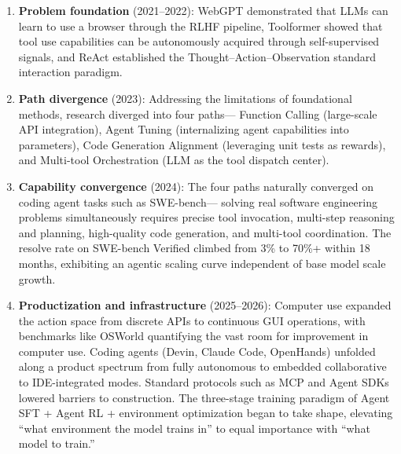 \begin{enumerate}[leftmargin=2em]
  \item \textbf{Problem foundation} (2021--2022):
    WebGPT demonstrated that LLMs can learn to use a browser through the RLHF pipeline,
    Toolformer showed that tool use capabilities can be autonomously acquired through self-supervised signals,
    and ReAct established the Thought--Action--Observation standard interaction paradigm.

  \item \textbf{Path divergence} (2023):
    Addressing the limitations of foundational methods, research diverged into four paths---
    Function Calling (large-scale API integration),
    Agent Tuning (internalizing agent capabilities into parameters),
    Code Generation Alignment (leveraging unit tests as rewards),
    and Multi-tool Orchestration (LLM as the tool dispatch center).

  \item \textbf{Capability convergence} (2024):
    The four paths naturally converged on coding agent tasks such as SWE-bench---
    solving real software engineering problems simultaneously requires precise tool invocation,
    multi-step reasoning and planning, high-quality code generation, and multi-tool coordination.
    The resolve rate on SWE-bench Verified climbed from 3\% to 70\%+ within 18 months,
    exhibiting an agentic scaling curve independent of base model scale growth.

  \item \textbf{Productization and infrastructure} (2025--2026):
    Computer use expanded the action space from discrete APIs to continuous GUI operations,
    with benchmarks like OSWorld quantifying the vast room for improvement in computer use.
    Coding agents (Devin, Claude Code, OpenHands)
    unfolded along a product spectrum from fully autonomous to embedded collaborative to IDE-integrated modes.
    Standard protocols such as MCP and Agent SDKs lowered barriers to construction.
    The three-stage training paradigm of Agent SFT + Agent RL + environment optimization began to take shape,
    elevating ``what environment the model trains in'' to equal importance with ``what model to train.''
\end{enumerate}


